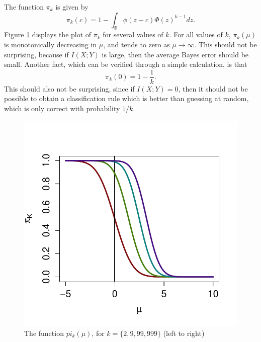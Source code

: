 \documentclass[12pt]{article}
\begin{document}
The function $\pi_k$ is given by
\[
\pi_k(c) = 1 - \int_{\mathbb{R}} \phi(z - c)  \Phi(z)^{k-1} dz.
\]
Figure \ref{fig:pi} displays the plot of $\pi_k$ for several values of $k$.
For all values of $k$, $\pi_k(\mu)$ is monotonically decreasing in $\mu$, and tends to zero as $\mu \to \infty$.
This should not be surprising, because if $I(X; Y)$ is large, then the average Bayes error should be small.
Another fact, which can be verified through a simple calculation, is that 
\[
\pi_k(0) = 1 - \frac{1}{k}.
\]
This should also not be surprising, since if $I(X; Y) = 0$, then it should not be possible to
obtain a classification rule which is better than guessing at random, which is only correct with probability $1/k$.
\begin{figure}
\centering
\includegraphics[scale = 0.5, clip=true, trim=0 0.2in 0 0.5in]{../info_theory_sims/illus_piK.pdf}
\caption{The function $pi_k(\mu)$, for $k = \{2, 9, 99, 999\}$ (left to right) \label{fig:pi}}
\end{figure}
\end{document}
